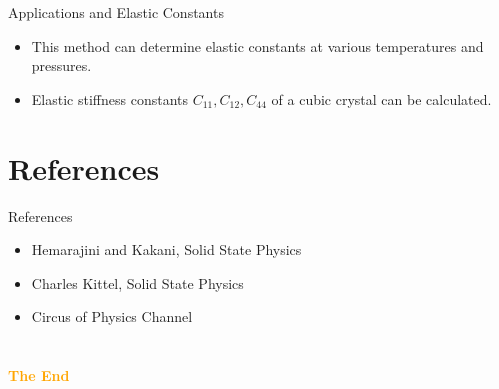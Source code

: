\documentclass[aspectratio=43]{beamer}
\begin{document}
\begin{frame}{Applications and Elastic Constants}
    \begin{itemize}
        \item This method can determine elastic constants at various temperatures and pressures.
        \item Elastic stiffness constants $C_{11}, C_{12}, C_{44}$ of a cubic crystal can be calculated.
    \end{itemize}
\end{frame}

    
    
    
    \section*{References} %
        \begin{frame}{References}
            \begin{itemize}
            \item Hemarajini and Kakani, Solid State Physics
            \item Charles Kittel, Solid State Physics
            \item Circus of Physics Channel
            \end{itemize}
        \end{frame}

    \section{}
    \begin{frame}{}
        \centering
            \Huge\bfseries
        \textcolor{orange}{The End}
    \end{frame}
\end{document}
